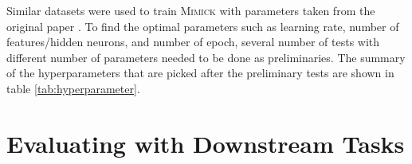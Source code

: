         Similar datasets were used to train \textsc{Mimick} with
        parameters taken from the original paper
        \citep{mimicking2017Pinter}. To find the optimal parameters
        such as learning rate, number of features/hidden neurons, and
        number of epoch, several number of tests with different number
        of parameters needed to be done as preliminaries. The summary
        of the hyperparameters that are picked after the preliminary
        tests are shown in table \ref{tab:hyperparameter}.


    
\section{Evaluating with Downstream Tasks}
